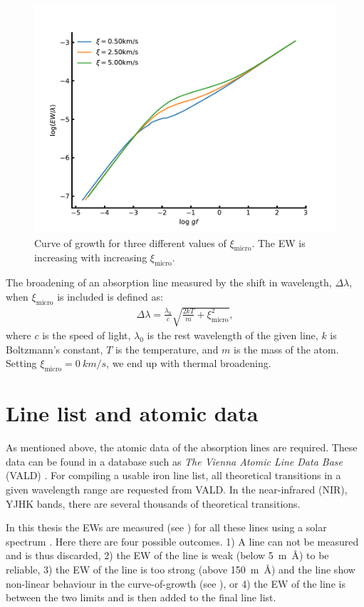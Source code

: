 \begin{figure}[htpb!]
    \centering
    \includegraphics[width=0.85\linewidth]{figures/cog_vt.pdf}
    \caption{Curve of growth for three different values of $\xi_\mathrm{micro}$. The EW is
             increasing with increasing $\xi_\mathrm{micro}$.}
    \label{fig:cog_vt}
\end{figure}

The broadening of an absorption line measured by the shift in wavelength, $\Delta\lambda$, when
$\xi_\mathrm{micro}$ is included is defined as:
\begin{align}
  \Delta\lambda = \frac{\lambda_0}{c} \sqrt{\frac{2kT}{m} + \xi_\mathrm{micro}^2},
\end{align}
where $c$ is the speed of light, $\lambda_0$ is the rest wavelength of the given line, $k$ is
Boltzmann's constant, $T$ is the temperature, and $m$ is the mass of the atom. Setting
$\xi_\mathrm{micro}=\SI{0}{km/s}$, we end up with thermal broadening.


\section{Line list and atomic data}
\label{sec:linelist}

As mentioned above, the atomic data of the absorption lines are required. These data can be found in
a database such as \emph{The Vienna Atomic Line Data Base} (VALD) \citep{VALD1,VALD2}. For compiling
a usable iron line list, all theoretical transitions in a given wavelength range are requested from
VALD. In the near-infrared (NIR), YJHK bands, there are several thousands of theoretical
transitions.

In this thesis the EWs are measured (see ) for all these lines using a solar
spectrum \citep[][is used here]{Hinkle1995}. Here there are four possible outcomes. 1) A line can
not be measured and is thus discarded, 2) the EW of the line is weak (below \SI{5}{m\angstrom}) to
be reliable, 3) the EW of the line is too strong (above \SI{150}{m\angstrom}) and the line show
non-linear behaviour in the curve-of-growth (see ), or 4) the EW of the line is
between the two limits and is then added to the final line list.

